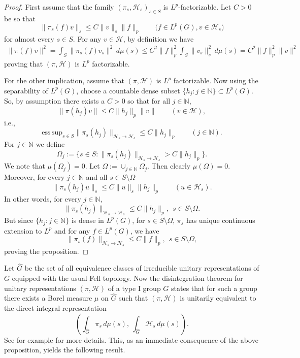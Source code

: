 \documentclass[12pt,letterpaper,titlepage,reqno]{amsart}
\theoremstyle{plain}
\theoremstyle{definition}
\numberwithin{equation}{section}
\newcommand{\cH}{\mathcal{H}}
\newcommand{\N}{\mathbb{N}}
\begin{document}
\begin{proof}
First assume that the family $(\pi_s,\cH_s)_{s\in S}$ is $L^p$-factorizable. Let $C>0$ be so that
$$
\|\pi_s(f)v\|_{s}
\leq C \|v\|_s\|f\|_p\qquad \big(f\in L^{p}(G),v\in \cH_s\big)
$$
for almost every $s\in S$.
For any $v\in \cH$, by definition we have
\begin{align*}
\|\pi(f)v\|^2 =\int_{S}\|\pi_s(f)v_s\|^2\,d\mu(s)
\leq C^{2} \|f\|_p^{2} \int_{S}\|v_s\|^2_s\,d\mu(s)
= C^{2} \|f\|_p^{2}\|v\|^{2}
\end{align*}
proving that $(\pi, \cH)$ is $L^p$ factorizable.

For the other implication, assume that $(\pi, \cH)$ is $L^p$ factorizable. Now using the separability of $L^p(G)$, choose a countable dense subset $\{h_j:j\in\mathbb{N}\}\subset L^p(G)$. So, by assumption there exists a $C>0$ so that for all $j\in \mathbb{N}$,
$$
\|\pi(h_j)v\|\leq C \|h_j\|_p\|v\|\qquad(v\in \cH),
$$
i.e.,
$$
\mathrm{ess\, sup}_{s\in S}\|\pi_s(h_j)\|_{\cH_s\rightarrow \cH_s}\leq C\|h_j\|_p\qquad (j\in \mathbb{N}).
$$
For $j\in\N$ we define
$$
\Omega_{j}
:=\{s\in S:\|\pi_s(h_j)\|_{\cH_s\rightarrow \cH_s}> C \|h_j\|_p\} .
$$
We note that $\mu(\Omega_{j})=0$.
Let $\Omega:=\cup_{j\in \mathbb{N}}\Omega_j$. Then clearly $\mu(\Omega)=0$. Moreover, for every $j\in \mathbb{N}$ and all $s\in S\setminus\Omega$
$$
\|\pi_s(h_j)u\|_{s}
\leq C \|u\|_s\|h_j\|_p\qquad(u\in \cH_s).
$$
In other words, for every $j\in \mathbb{N}$, $$\|\pi_s(h_j)\|_{\cH_s\rightarrow \cH_s}\leq C\|h_j\|_p,~~s\in S\setminus \Omega.$$ But since $\{h_j:j\in\mathbb{N}\}$ is dense in $L^p(G)$, for $s\in S\setminus \Omega$, $\pi_s$ has unique continuous extension to $L^p$ and for any $f\in L^p(G)$, we have
$$\|\pi_s(f)\|_{\cH_s\rightarrow \cH_s}\leq C\|f\|_p,~~s\in S\setminus \Omega,$$ proving the proposition.
\end{proof}

Let $\widehat{G}$ be the set of all equivalence classes of irreducible unitary representations of $G$ equipped with the usual Fell topology.
Now the disintegration theorem for unitary representations $(\pi, \cH)$ of a type I group $G$ states that for such a group there exists a Borel  measure $\mu$ on $\widehat{G}$ such that $(\pi, \cH)$ is unitarily equivalent to the direct integral representation
$$
\left(\int_{\widehat{G}}\pi_s\,d\mu(s),~\int_{\widehat{G}}\cH_s\,d\mu(s)\right).
$$
See for example \cite[Theorem 14.10.5]{W2} for more details. This, as an immediate consequence of the above proposition, yields the following result.
\end{document}
